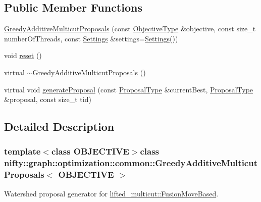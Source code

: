 \subsection*{Public Member Functions}
\begin{DoxyCompactItemize}
\item 
\hyperlink{classnifty_1_1graph_1_1optimization_1_1common_1_1GreedyAdditiveMulticutProposals_acaac8bcf15d8bc6ba067ef3d38139751}{Greedy\+Additive\+Multicut\+Proposals} (const \hyperlink{classnifty_1_1graph_1_1optimization_1_1common_1_1GreedyAdditiveMulticutProposals_a82ebea313ce98149a4ac7003b792d6fe}{Objective\+Type} \&objective, const size\+\_\+t number\+Of\+Threads, const \hyperlink{structnifty_1_1graph_1_1optimization_1_1common_1_1GreedyAdditiveMulticutProposals_1_1Settings}{Settings} \&settings=\hyperlink{structnifty_1_1graph_1_1optimization_1_1common_1_1GreedyAdditiveMulticutProposals_1_1Settings}{Settings}())
\item 
void \hyperlink{classnifty_1_1graph_1_1optimization_1_1common_1_1GreedyAdditiveMulticutProposals_ac2882a1bc7965030f8e477be1f4e427f}{reset} ()
\item 
virtual \hyperlink{classnifty_1_1graph_1_1optimization_1_1common_1_1GreedyAdditiveMulticutProposals_a4b1dbdc649ea98864bca984afd3a1c8a}{$\sim$\+Greedy\+Additive\+Multicut\+Proposals} ()
\item 
virtual void \hyperlink{classnifty_1_1graph_1_1optimization_1_1common_1_1GreedyAdditiveMulticutProposals_a61254ea7da2ebb0da33c545449951ada}{generate\+Proposal} (const \hyperlink{classnifty_1_1graph_1_1optimization_1_1common_1_1GreedyAdditiveMulticutProposals_a2344bbd2084e7c62a179e6f0ce2d11f8}{Proposal\+Type} \&current\+Best, \hyperlink{classnifty_1_1graph_1_1optimization_1_1common_1_1GreedyAdditiveMulticutProposals_a2344bbd2084e7c62a179e6f0ce2d11f8}{Proposal\+Type} \&proposal, const size\+\_\+t tid)
\end{DoxyCompactItemize}


\subsection{Detailed Description}
\subsubsection*{template$<$class O\+B\+J\+E\+C\+T\+I\+V\+E$>$class nifty\+::graph\+::optimization\+::common\+::\+Greedy\+Additive\+Multicut\+Proposals$<$ O\+B\+J\+E\+C\+T\+I\+V\+E $>$}

Watershed proposal generator for \hyperlink{classnifty_1_1graph_1_1lifted__multicut_1_1FusionMoveBased}{lifted\+\_\+multicut\+::\+Fusion\+Move\+Based}. 


